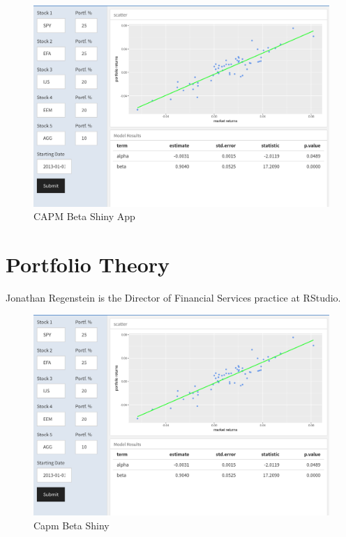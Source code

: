 \documentclass[]{krantz}
\begin{document}
\begin{figure}
\includegraphics[width=1\linewidth]{snapshots/capm-beta-shiny} \caption{CAPM Beta Shiny App}\label{fig:unnamed-chunk-41}
\end{figure}

\chapter{Portfolio Theory}\label{portfolio-theory}

Jonathan Regenstein is the Director of Financial Services practice at
RStudio.

\begin{figure}
\centering
\includegraphics{snapshots/capm-beta-shiny.png}
\caption{Capm Beta Shiny}
\end{figure}
\end{document}
